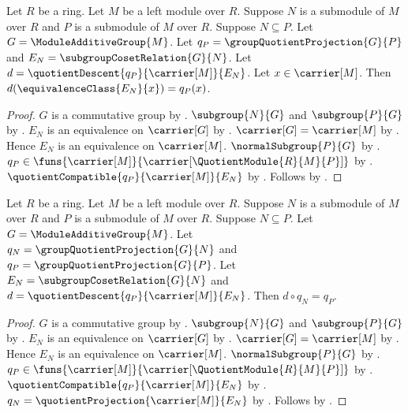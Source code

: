 \begin{proposition}\label{module_quotient_comparison_apply}
    Let $R$ be a ring.
    Let $M$ be a left module over $R$.
    Suppose $N$ is a submodule of $M$ over $R$ and
        $P$ is a submodule of $M$ over $R$.
    Suppose $N\subseteq P$.
    Let $G=\ModuleAdditiveGroup{M}$.
    Let $q_P=\groupQuotientProjection{G}{P}$ and
        $E_N=\subgroupCosetRelation{G}{N}$.
    Let $d=\quotientDescent{q_P}{\carrier[M]}{E_N}$.
    Let $x\in\carrier[M]$.
    Then $d(\equivalenceClass{E_N}{x})=q_P(x)$.
\end{proposition}
\begin{proof}
    $G$ is a commutative group by
        .
    $\subgroup{N}{G}$ and $\subgroup{P}{G}$ by
        .
    $E_N$ is an equivalence on $\carrier[G]$ by
        .
    $\carrier[G]=\carrier[M]$ by
        .
    Hence $E_N$ is an equivalence on $\carrier[M]$.
    $\normalSubgroup{P}{G}$ by
        .
    $q_P\in\funs{\carrier[M]}{
        \carrier[\QuotientModule{R}{M}{P}]}$ by
        .
    $\quotientCompatible{q_P}{\carrier[M]}{E_N}$ by
        .
    Follows by .
\end{proof}

\begin{theorem}\label{module_quotient_comparison_factorization}
    Let $R$ be a ring.
    Let $M$ be a left module over $R$.
    Suppose $N$ is a submodule of $M$ over $R$ and
        $P$ is a submodule of $M$ over $R$.
    Suppose $N\subseteq P$.
    Let $G=\ModuleAdditiveGroup{M}$.
    Let $q_N=\groupQuotientProjection{G}{N}$ and
        $q_P=\groupQuotientProjection{G}{P}$.
    Let $E_N=\subgroupCosetRelation{G}{N}$ and
        $d=\quotientDescent{q_P}{\carrier[M]}{E_N}$.
    Then $d\circ q_N=q_P$.
\end{theorem}
\begin{proof}
    $G$ is a commutative group by
        .
    $\subgroup{N}{G}$ and $\subgroup{P}{G}$ by
        .
    $E_N$ is an equivalence on $\carrier[G]$ by
        .
    $\carrier[G]=\carrier[M]$ by
        .
    Hence $E_N$ is an equivalence on $\carrier[M]$.
    $\normalSubgroup{P}{G}$ by
        .
    $q_P\in\funs{\carrier[M]}{
        \carrier[\QuotientModule{R}{M}{P}]}$ by
        .
    $\quotientCompatible{q_P}{\carrier[M]}{E_N}$ by
        .
    $q_N=\quotientProjection{\carrier[M]}{E_N}$ by
        .
    Follows by .
\end{proof}

